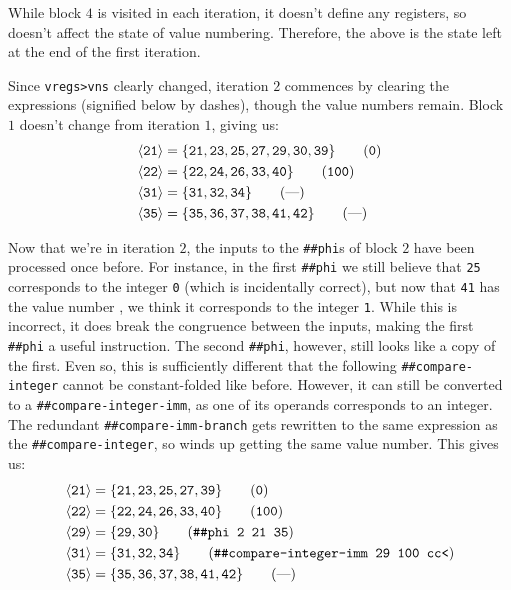 While block $4$ is visited in each iteration, it doesn't define any registers,
so doesn't affect the state of value numbering.  Therefore, the above is the
state left at the end of the first iteration.

Since \Verb|vregs>vns| clearly changed, iteration $2$ commences by clearing the
expressions (signified below by dashes), though the value numbers remain.
Block $1$ doesn't change from iteration $1$, giving us:
%
\begin{align*}
  \vn{21} &= \{\vreg{21},
               \vreg{23},
               \vreg{25},
               \vreg{27},
               \vreg{29},
               \vreg{30},
               \vreg{39}\} \tag{\texttt{0}} \\
  \vn{22} &= \{\vreg{22},
               \vreg{24},
               \vreg{26},
               \vreg{33},
               \vreg{40}\} \tag{\texttt{100}} \\
  \vn{31} &= \{\vreg{31},
               \vreg{32},
               \vreg{34}\} \tag{\text{---}} \\
  \vn{35} &= \{\vreg{35},
               \vreg{36},
               \vreg{37},
               \vreg{38},
               \vreg{41},
               \vreg{42}\} \tag{\text{---}}
\end{align*}

Now that we're in iteration $2$, the inputs to the \Verb|##phi|s of block $2$
have been processed once before.  For instance, in the first \Verb|##phi| we
still believe that \Verb|25| corresponds to the integer \Verb|0| (which is
incidentally correct), but now that \Verb|41| has the value number , we
think it corresponds to the integer \Verb|1|.  While this is incorrect, it does
break the congruence between the inputs, making the first \Verb|##phi| a useful
instruction.  The second \Verb|##phi|, however, still looks like a copy of the
first.  Even so, this is sufficiently different that the following
\Verb|##compare-integer| cannot be constant-folded like before.  However, it
can still be converted to a \Verb|##compare-integer-imm|, as one of its
operands corresponds to an integer.  The redundant \Verb|##compare-imm-branch|
gets rewritten to the same expression as the \Verb|##compare-integer|, so winds
up getting the same value number.  This gives us:
%
\begin{align*}
  \vn{21} &= \{\vreg{21},
               \vreg{23},
               \vreg{25},
               \vreg{27},
               \vreg{39}\} \tag{\texttt{0}} \\
  \vn{22} &= \{\vreg{22},
               \vreg{24},
               \vreg{26},
               \vreg{33},
               \vreg{40}\} \tag{\texttt{100}} \\
  \vn{29} &= \{\vreg{29},
               \vreg{30}\} \tag{\texttt{\#\#phi 2 21 35}} \\
  \vn{31} &= \{\vreg{31},
               \vreg{32},
               \vreg{34}\} \tag{\texttt{\#\#compare-integer-imm 29 100 cc<}} \\
  \vn{35} &= \{\vreg{35},
               \vreg{36},
               \vreg{37},
               \vreg{38},
               \vreg{41},
               \vreg{42}\} \tag{\text{---}}
\end{align*}

